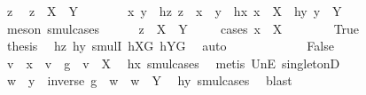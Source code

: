\begin{isabellebody}
\ z\ \isamarkupfalse%
\ {\isachardoublequoteopen}z\ {\isasymin}\ {\isacharquery}{\kern0pt}X{}\ {\isasymcdots}\ {\isacharquery}{\kern0pt}Y{}{\isachardoublequoteclose}\isanewline
\ \ \ \ \isamarkupfalse%
\ \isamarkupfalse%
\ x\ y\ \ hz{\isacharcolon}{\kern0pt}\ {\isachardoublequoteopen}z\ {\isacharequal}{\kern0pt}\ x\ {\isasymcdot}\ y{\isachardoublequoteclose}\ \ hx{\isacharcolon}{\kern0pt}\ {\isachardoublequoteopen}x\ {\isasymin}\ {\isacharquery}{\kern0pt}X{}{\isachardoublequoteclose}\ \ hy{\isacharcolon}{\kern0pt}\ {\isachardoublequoteopen}y\ {\isasymin}\ {\isacharquery}{\kern0pt}Y{}{\isachardoublequoteclose}\ \isamarkupfalse%
\ {\isacharparenleft}{\kern0pt}meson\ smul{\isachardot}{\kern0pt}cases{\isacharparenright}{\kern0pt}\isanewline
\ \ \ \ \isamarkupfalse%
\ {\isachardoublequoteopen}z\ {\isasymin}\ X\ {\isasymcdots}\ Y{\isachardoublequoteclose}\isanewline
\ \ \ \ \isamarkupfalse%
{\isacharparenleft}{\kern0pt}cases\ {\isachardoublequoteopen}x\ {\isasymin}\ X{\isachardoublequoteclose}{\isacharparenright}{\kern0pt}\isanewline
\ \ \ \ \ \ \isamarkupfalse%
\ True\isanewline
\ \ \ \ \ \ \isamarkupfalse%
\ \isamarkupfalse%
\ {\isacharquery}{\kern0pt}thesis\ \isamarkupfalse%
\ hz\ hy\ smulI\ hXG\ hYG\ \isamarkupfalse%
\ auto\isanewline
\ \ \ \ \isamarkupfalse%
\isanewline
\ \ \ \ \ \ \isamarkupfalse%
\ False\isanewline
\ \ \ \ \ \ \isamarkupfalse%
\ \isamarkupfalse%
\ v\ \ {\isachardoublequoteopen}x\ {\isacharequal}{\kern0pt}\ v\ {\isasymcdot}\ g{\isachardoublequoteclose}\ \ {\isachardoublequoteopen}v\ {\isasymin}\ X{\isachardoublequoteclose}\ \isamarkupfalse%
\ hx\ smul{\isachardot}{\kern0pt}cases\ \isamarkupfalse%
\ {\isacharparenleft}{\kern0pt}metis\ UnE\ singletonD{\isacharparenright}{\kern0pt}\isanewline
\ \ \ \ \ \ \isamarkupfalse%
\ \isamarkupfalse%
\ w\ \ {\isachardoublequoteopen}y\ {\isacharequal}{\kern0pt}\ inverse\ g\ {\isasymcdot}\ w{\isachardoublequoteclose}\ \ {\isachardoublequoteopen}w\ {\isasymin}\ Y{\isachardoublequoteclose}\ \isamarkupfalse%
\ hy\ smul{\isachardot}{\kern0pt}cases\ \isamarkupfalse%
\ blast\isanewline
\ \ \ \ \ \ \isamarkupfalse%

\end{isabellebody}
